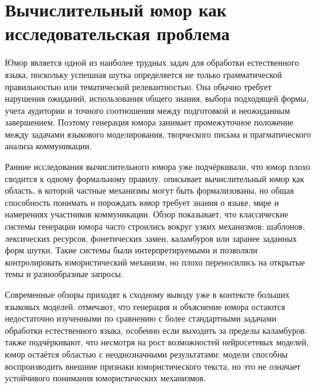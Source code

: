 \section{Вычислительный юмор как исследовательская проблема}

Юмор является одной из наиболее трудных задач для обработки естественного языка, поскольку успешная шутка определяется не только грамматической правильностью или тематической релевантностью. Она обычно требует нарушения ожиданий, использования общего знания, выбора подходящей формы, учета аудитории и точного соотношения между подготовкой и неожиданным завершением. Поэтому генерация юмора занимает промежуточное положение между задачами языкового моделирования, творческого письма и прагматического анализа коммуникации.

Ранние исследования вычислительного юмора уже подчёркивали, что юмор плохо сводится к одному формальному правилу. \citet{ritchie2001current} описывает вычислительный юмор как область, в которой частные механизмы могут быть формализованы, но общая способность понимать и порождать юмор требует знания о языке, мире и намерениях участников коммуникации. Обзор \citet{amin2020survey} показывает, что классические системы генерации юмора часто строились вокруг узких механизмов: шаблонов, лексических ресурсов, фонетических замен, каламбуров или заранее заданных форм шутки. Такие системы были интерпретируемыми и позволяли контролировать юмористический механизм, но плохо переносились на открытые темы и разнообразные запросы.

Современные обзоры приходят к сходному выводу уже в контексте больших языковых моделей. \citet{Loakman2025} отмечают, что генерация и объяснение юмора остаются недостаточно изученными по сравнению с более стандартными задачами обработки естественного языка, особенно если выходить за пределы каламбуров. \citet{lemmens2026computational} также подчёркивают, что несмотря на рост возможностей нейросетевых моделей, юмор остаётся областью с неоднозначными результатами: модели способны воспроизводить внешние признаки юмористического текста, но это не означает устойчивого понимания юмористических механизмов.

